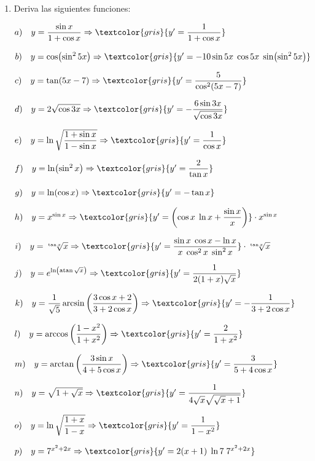 	\begin{enumerate}
		\item Deriva las siguientes funciones:
		
		
		$a) \quad y=\dfrac {\sin x}{1+\cos x} \Rightarrow \textcolor{gris}{y'=\dfrac {1}{1+\cos x}}$
		
		$b) \quad y=\cos (\sin^2 5x)   \Rightarrow \textcolor{gris}{ y'= -10 \sin 5x\; \cos 5x\; \sin(\sin^2 5x) }$	
		
		$c) \quad y= \tan(5x-7)  \Rightarrow \textcolor{gris}{ y'=\dfrac {5}{\cos^2 (5x-7)} }$
		
		$d) \quad y=2\sqrt{\cos 3x}   \Rightarrow \textcolor{gris}{ y'= -\dfrac{6\sin 3x}{\sqrt{\cos 3x}}}$
		
		$e) \quad y=\ln \sqrt{\dfrac {1 + \sin x}{1-\sin x}}   \Rightarrow \textcolor{gris}{ y'= \dfrac 1 {\cos x}}$
		
		$f) \quad y= \ln(\sin^2 x)  \Rightarrow \textcolor{gris}{ y'= \dfrac 2 {\tan x}}$
		
		$g) \quad y= \ln(\cos x)  \Rightarrow \textcolor{gris}{ y'= - \tan x }$
		
		$h) \quad y=x^{\sin x}   \Rightarrow \textcolor{gris}{ y'=\left( \cos x \; \ln x + \dfrac {\sin x}{x}  \right) }\cdot x^{\sin x}$
		
		$i) \quad y= \sqrt[\tan x]{x}  \Rightarrow \textcolor{gris}{ y'=\dfrac {\sin x \; \cos x - \ln x}{x\;  \cos^2x\; \sin^2 x} }\cdot \sqrt[\tan x]{x}$
		
		$j) \quad y= e^{\ln (\atan \sqrt
		x)}  \Rightarrow \textcolor{gris}{ y'= \dfrac 1 {2(1+x)\sqrt{x}} }$
		
		$k) \quad y=\dfrac {1}{\sqrt{5}} \arcsin \left( \dfrac {3\cos x + 2}{3+2\cos x} \right)   \Rightarrow \textcolor{gris}{ y'= -\dfrac {1}{3+2\cos x}}$
		
		$l) \quad y=\arccos \left(\dfrac {1-x^2}{1+x^2} \right)   \Rightarrow \textcolor{gris}{ y'= \dfrac {2}{1+x^2}}$
		
		$m) \quad y= \arctan \left(\dfrac {3 \sin x}{4+5\cos x} \right)  \Rightarrow \textcolor{gris}{ y'= \dfrac {3}{5+4\cos x} }$
		
		$n) \quad y= \sqrt { 1+\sqrt{x} }  \Rightarrow \textcolor{gris}{ y'=\dfrac {1}{4 \sqrt{x} \sqrt{\sqrt{x}+1}} } $
		
		$o) \quad y= \ln \sqrt{\dfrac {1+x}{1-x}}  \Rightarrow \textcolor{gris}{ y'= \dfrac {1}{1-x^2}}$
		
		$p) \quad y= 7^{x^2+2x}  \Rightarrow \textcolor{gris}{ y'= 2(x+1)\; \ln 7 \; 7^{x^2+2x} }$


\end{enumerate}
